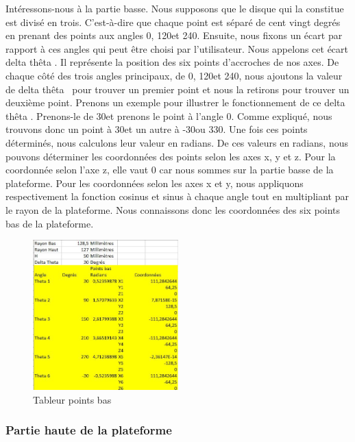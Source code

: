 \documentclass[a4paper,12pt]{article}
\begin{document}
Intéressons-nous à la partie basse. 
Nous supposons que le disque qui la constitue est divisé en trois. C’est-à-dire que chaque point est séparé de cent vingt degrés en prenant des points aux angles 0\degree, 120\degree et 240\degree. 
Ensuite, nous fixons un écart par rapport à ces angles qui peut être choisi par l’utilisateur. 
Nous appelons cet écart \og delta thêta \fg. Il représente la position des six points d’accroches de nos axes. 
De chaque côté des trois angles principaux, de 0\degree, 120\degree et 240\degree, nous ajoutons la valeur de \og delta thêta \fg \ pour trouver un premier point et nous la retirons pour trouver un deuxième point. 
Prenons un exemple pour illustrer le fonctionnement de ce \og delta thêta \fg . 
Prenons-le de 30\degree et prenons le point à l’angle 0\degree. Comme expliqué, nous trouvons donc un point à 30\degree et un autre à -30\degree ou 330\degree. 
Une fois ces points déterminés, nous calculons leur valeur en radians. 
De ces valeurs en radians, nous pouvons déterminer les coordonnées des points selon les axes x, y et z. 
Pour la coordonnée selon l’axe z, elle vaut 0 car nous sommes sur la partie basse de la plateforme. 
Pour les coordonnées selon les axes x et y, nous appliquons respectivement la fonction cosinus et sinus à chaque angle tout en multipliant par le rayon de la plateforme. 
Nous connaissons donc les coordonnées des six points bas de la plateforme.


\begin{figure}[H]
  \centering
  \includegraphics[width=0.5\textwidth]{tableur points bas.jpg}
  \caption{Tableur points bas}
\end{figure}

\subsubsection{Partie haute de la plateforme}
\end{document}
